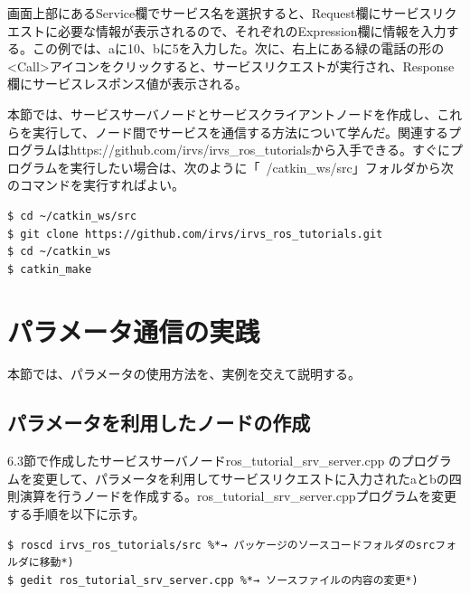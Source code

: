 画面上部にあるService欄でサービス名を選択すると、Request欄にサービスリクエストに必要な情報が表示されるので、それぞれのExpression欄に情報を入力する。この例では、aに10、bに5を入力した。次に、右上にある緑の電話の形の<Call>アイコンをクリックすると、サービスリクエストが実行され、Response欄にサービスレスポンス値が表示される。

本節では、サービスサーバノードとサービスクライアントノードを作成し、これらを実行して、ノード間でサービスを通信する方法について学んだ。関連するプログラムはhttps://github.com/irvs/irvs\_ros\_tutorialsから入手できる。すぐにプログラムを実行したい場合は、次のように「~/catkin\_ws/src」フォルダから次のコマンドを実行すればよい。

\begin{lstlisting}[language=ROS]
$ cd ~/catkin_ws/src
$ git clone https://github.com/irvs/irvs_ros_tutorials.git
$ cd ~/catkin_ws
$ catkin_make
\end{lstlisting}

\section{パラメータ通信の実践}

本節では、パラメータの使用方法を、実例を交えて説明する。

\subsection{パラメータを利用したノードの作成}

6.3節で作成したサービスサーバノードros\_tutorial\_srv\_server.cpp  のプログラムを変更して、パラメータを利用してサービスリクエストに入力されたaとbの四則演算を行うノードを作成する。ros\_tutorial\_srv\_server.cppプログラムを変更する手順を以下に示す。

\begin{lstlisting}[language=ROS]
$ roscd irvs_ros_tutorials/src %*→ パッケージのソースコードフォルダのsrcフォルダに移動*)
$ gedit ros_tutorial_srv_server.cpp %*→ ソースファイルの内容の変更*)
\end{lstlisting}

